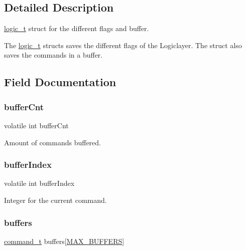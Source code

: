 \subsection{Detailed Description}
\mbox{\hyperlink{struct_l_l_1_1logic__t}{logic\+\_\+t}} struct for the different flags and buffer. 

The \mbox{\hyperlink{struct_l_l_1_1logic__t}{logic\+\_\+t}} structs saves the different flags of the Logiclayer. The struct also saves the commands in a buffer. 

\subsection{Field Documentation}
\mbox{\label{struct_l_l_1_1logic__t_af3833538ae97a141cd1c33f92d0de926}} 
\subsubsection{\texorpdfstring{buffer\+Cnt}{bufferCnt}}
{\footnotesize\ttfamily volatile int buffer\+Cnt}

Amount of commands buffered. \mbox{\label{struct_l_l_1_1logic__t_a4b89a73e0fa3f732d2ad4bc0982f83f1}} 
\subsubsection{\texorpdfstring{buffer\+Index}{bufferIndex}}
{\footnotesize\ttfamily volatile int buffer\+Index}

Integer for the current command. \mbox{\label{struct_l_l_1_1logic__t_a09663354d4cddc7fc94fce6d60c2a9a2}} 
\subsubsection{\texorpdfstring{buffers}{buffers}}
{\footnotesize\ttfamily \mbox{\hyperlink{struct_l_l_1_1command__t}{command\+\_\+t}} buffers\mbox{[}\mbox{\hyperlink{group___global_ga7781bc9613ec655352585fb1bac2595d}{M\+A\+X\+\_\+\+B\+U\+F\+F\+E\+RS}}\mbox{]}}

